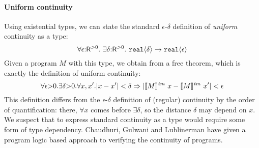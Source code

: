 \paragraph{Uniform continuity}
Using %
existential types, %
we can state the standard $\epsilon$-$\delta$ definition of
\emph{uniform} continuity as a type:
\begin{displaymath}
  \forall \epsilon \mathord: \mathsf{R}^{>0}.\ \exists \delta\mathord: \mathsf{R}^{>0}.\ \textup{\texttt{real}}\langle \delta \rangle \to \textup{\texttt{real}}\langle \epsilon \rangle
\end{displaymath}
Given a program $M$ with this type, we obtain from
 a free theorem, which is exactly the
definition of uniform continuity:
\begin{displaymath}
  \forall \epsilon \mathord> 0. \exists \delta \mathord> 0. \forall x,x'. |x - x'| < \delta \Rightarrow |\llbracket M \rrbracket^{\mathit{tm}}\ x - \llbracket M \rrbracket^{\mathit{tm}}\ x'| < \epsilon
\end{displaymath}
This definition differs from the $\epsilon$-$\delta$ definition of
(regular) continuity by the order of quantification:
there, $\forall x$ comes before $\exists \delta$, so the distance
$\delta$ may depend on %
$x$. We suspect that to express standard continuity as a type would
require some form of type dependency. Chaudhuri, Gulwani and
Lublinerman \cite{chaudhuri10continuity} have given a program logic
based approach to verifying the continuity of programs.













